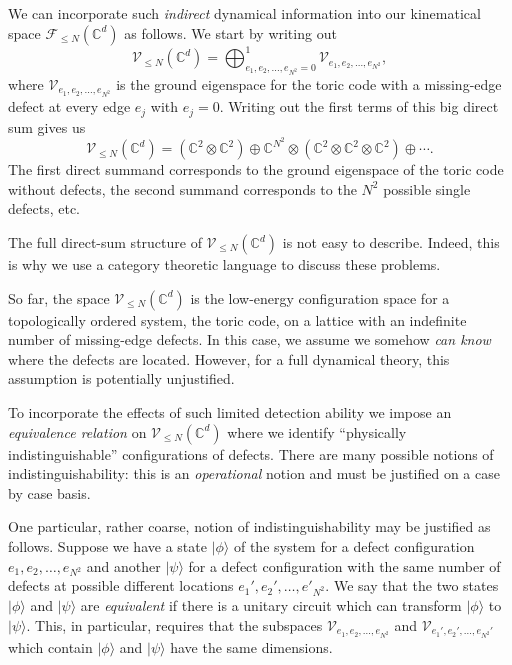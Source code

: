 \documentclass[aps,prb,twocolumn,superscriptaddress,noshowkeys]{revtex4-2}  %
\theoremstyle{plain}%
\theoremstyle{definition}
\theoremstyle{remark}
\begin{document}
We can incorporate such \emph{indirect} dynamical information into our kinematical space $\mathcal{F}_{\le N}(\mathbb{C}^d)$ as follows. We start by writing out 
\begin{equation}
\mathcal{V}_{\le N}(\mathbb{C}^d) = \bigoplus_{e_1,e_2, \ldots, e_{N^2} =0}^1 \mathcal{V}_{e_1,e_2,\ldots, e_{N^2}},
\end{equation}
where $\mathcal{V}_{e_1,e_2,\ldots, e_{N^2}}$ is the ground eigenspace for the toric code with a missing-edge defect at every edge $e_j$ with $e_j=0$. Writing out the first terms of this big direct sum gives us
\begin{equation}
\mathcal{V}_{\le N}(\mathbb{C}^d) = (\mathbb{C}^2\otimes \mathbb{C}^2)\oplus \mathbb{C}^{N^2}\otimes (\mathbb{C}^2\otimes \mathbb{C}^2\otimes \mathbb{C}^2)\oplus \cdots.
\end{equation}
The first direct summand corresponds to the ground eigenspace of the toric code without defects, the second summand corresponds to the $N^2$ possible single defects, etc.

The full direct-sum structure of $\mathcal{V}_{\le N}(\mathbb{C}^d)$ is not easy to describe. Indeed, this is why we use a category theoretic language to discuss these problems. 

So far, the space $\mathcal{V}_{\le N}(\mathbb{C}^d)$ is the low-energy configuration space for a topologically ordered system, the toric code, on a lattice with an indefinite number of missing-edge defects. In this case, we assume we somehow \emph{can know} where the defects are located. However, for a full dynamical theory, this assumption is potentially unjustified.

To incorporate the effects of such limited detection ability we impose an \emph{equivalence relation} on $\mathcal{V}_{\le N}(\mathbb{C}^d)$ where we identify ``physically indistinguishable'' configurations of defects. There are many possible notions of indistinguishability: this is an \emph{operational} notion and must be justified on a case by case basis. 

One particular, rather coarse, notion of indistinguishability may be justified as follows. Suppose we have a state $|\phi\rangle$ of the system for a defect configuration $e_1,e_2, \ldots, e_{N^2}$ and another $|\psi\rangle$ for a defect configuration with the same number of defects at possible different locations $e_1',e_2',\ldots, e'_{N^2}$. We say that the two states $|\phi\rangle$ and $|\psi\rangle$ are \emph{equivalent} if there is a unitary circuit which can transform $|\phi\rangle$ to $|\psi\rangle$. This, in particular, requires that the subspaces $\mathcal{V}_{e_1,e_2,\ldots,e_{N^2}}$ and $\mathcal{V}_{e_1',e_2',\ldots,e_{N^2}'}$ which contain $|\phi\rangle$ and $|\psi\rangle$ have the same dimensions.
\end{document}
